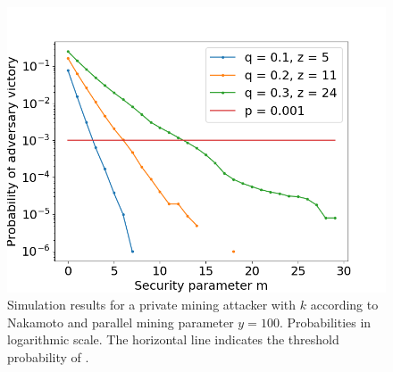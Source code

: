 \begin{figure}
    \caption{\label{fig.nipopow-attack-experiment}
        Simulation results for a private mining attacker with $k$ according to
        Nakamoto and parallel mining parameter $y = 100$. Probabilities in
        logarithmic scale. The horizontal line indicates the threshold
        probability of \cite{bitcoin}.
    }
    \centering
    \includegraphics[width=0.7\columnwidth,keepaspectratio]{chapters/work/figures/nipopow-attack-experiment-onecolumn.png}
\end{figure}
